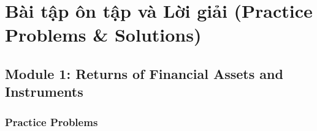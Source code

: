 \newpage

\section{Bài tập ôn tập và Lời giải (Practice Problems \& Solutions)}
\label{chap:Practice Problems and Solutions}
\subsection{Module 1: Returns of Financial Assets and Instruments}
\label{sec:app_Problems_M1}

\subsubsection{Practice Problems}
\label{subsec:app_Problems_M1}

